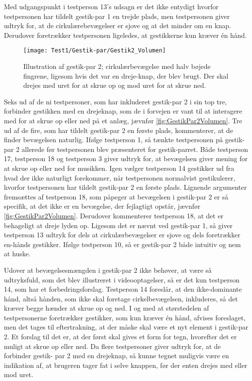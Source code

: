 Med udgangspunkt i testperson 13’s udsagn er det ikke entydigt hvorfor testpersonen har tildelt gestik-par 1 en trejde plads, men testpersonen giver udtryk for, at de cirkulærebevægelser er sjove og at det minder om en knap. Derudover foretrækker testpersonen ligeledes, at gestikkerne kun kræver én hånd.
%
\begin{figure}[H]
	\centering
	\texttt{[image: Test1/Gestik-par/Gestik2\_Volumen]}
	\caption{Illustration af gestik-par 2; cirkulærbevægelse med halv bøjede fingrene, ligesom hvis det var en dreje-knap, der blev brugt. Der skal drejes med uret for at skrue op og mod uret for at skrue ned.}
	\label{fig:GestikPar2Volumen}
\end{figure}
\noindent
%
Seks ud af de ni testpersoner, som har inkluderet gestik-par 2 i sin top tre, forbinder gestikken med en drejeknap, som de i forvejen er vant til at interagere med for at skrue op eller ned på et anlæg, jævnfør \autoref{fig:GestikPar2Volumen}. Tre ud af de fire, som har tildelt gestik-par 2 en første plads, kommenterer, at de finder bevægelsen naturlig. Ifølge testperson 1, så tænkte testpersonen på gestik-par 2 allerede før testpersonen blev præsenteret for gestik-parret. Både testperson 17, testperson 18 og testperson 3 giver udtryk for, at bevægelsen giver mening for at skrue op eller ned for musikken. Igen vælger testperson 14 gestikker ud fra hvad der ikke naturligt forekommer, når testpersonen normalvist gestikulerer, hvorfor testpersonen har tildelt gestik-par 2 en første plads. Lignende argumenter fremsættes af testperson 18, som påpeger at bevægelsen i gestik-par 2 er så specifik, at det ikke er en bevægelse, der fejlagtigt opstår, jævnfør \autoref{fig:GestikPar2Volumen}. Derudover kommenterer testperson 18, at det er behageligt at dreje lyden op. Ligesom det er nævnt ved gestik-par 1, så giver testperson 13 udtryk for dels at cirkulærbevægelser er sjove og dels foretrækker en-hånds gestikker. Ifølge testperson 10, så er gestik-par 2 både intuitiv og nem at huske.

Udover at bevægelsesmængden i gestik-par 2 ikke behøver, at være så udtryksfuld, som det blev illustreret i videooptagelser, så er det kun testperson 14, som har et forbedringsforslag. Testperson 14 foreslår, at den ikke-dominante hånd, altså hånden, som ikke skal foretage cirkelbevægelsen, inkluderes, så det kræver begge hænder at skrue op og ned. I og med at størstedelen af testpersonerne foretrækker gestikker, som kun kræver én hånd, afvises foreslaget, men det tages til eftertrakning, at der måske skal være et nyt element i gestik-par 2. Et forslag til det er, at der først skal gives et form for tegn, hvorefter det er muligt at skrue op eller ned. Da flere testpersoner giver udtryk for, at de forbinder gestik- par 2 med en drejeknap, så kunne tegnet muligvis være en indikation af, at brugeren tager fat i selve knappen, før der enten drejes med eller mod uret.

